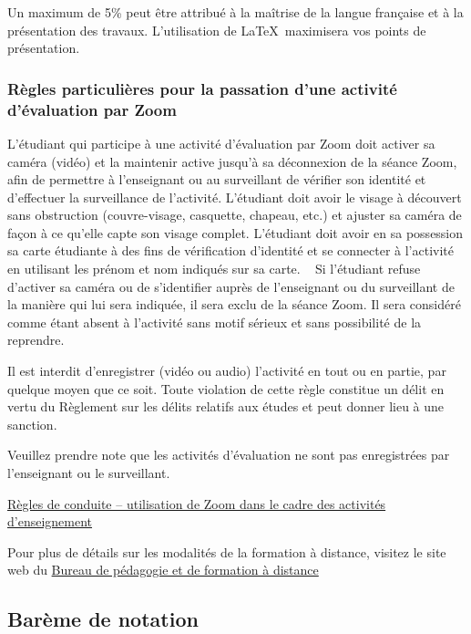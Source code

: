 \documentclass[12pt,undergraduate]{uqtrplandecours}
\begin{document}
Un maximum de 5\% peut être attribué à la maîtrise de la langue française
  et à la présentation des travaux.
%
L'utilisation de \LaTeX \ maximisera vos points de présentation.


\subsubsection*{Règles particulières pour la passation d’une activité d’évaluation par Zoom}

L’étudiant qui participe à une activité d’évaluation par Zoom doit activer sa caméra (vidéo) et la maintenir active jusqu’à sa déconnexion de la séance Zoom, afin de permettre à l’enseignant ou au surveillant de vérifier son identité et d’effectuer la surveillance de l’activité. L’étudiant doit avoir le visage à découvert sans obstruction (couvre-visage, casquette, chapeau, etc.) et ajuster sa caméra de façon à ce qu’elle capte son visage complet. L’étudiant doit avoir en sa possession sa carte étudiante à des fins de vérification d’identité et se connecter à l’activité en utilisant les prénom et nom indiqués sur sa carte.
 
Si l’étudiant refuse d’activer sa caméra ou de s’identifier auprès de l’enseignant ou du surveillant de la manière qui lui sera indiquée, il sera exclu de la séance Zoom. Il sera considéré comme étant absent à l’activité sans motif sérieux et sans possibilité de la reprendre.

Il est interdit d’enregistrer (vidéo ou audio) l’activité en tout ou en partie, par quelque moyen que ce soit. Toute violation de cette règle constitue un délit en vertu du Règlement sur les délits relatifs aux études et peut donner lieu à une sanction.

Veuillez prendre note que les activités d’évaluation ne sont pas enregistrées par l’enseignant ou le surveillant.

\medskip
\href{https://oraprdnt.uqtr.uquebec.ca/pls/public/docs/GSC5087/O0003262120_Regles_de_conduite_utilisation_Zoom.pdf}%
     {Règles de conduite – utilisation de Zoom dans le cadre des activités d’enseignement}

Pour plus de détails sur les modalités de la formation à distance, visitez le site web du
\href{https://oraprdnt.uqtr.uquebec.ca/pls/public/gscw031?owa_no_site=3939&owa_no_fiche=90}%
     {Bureau de pédagogie et de formation à distance}


\subsection*{Barème de notation}
\end{document}
